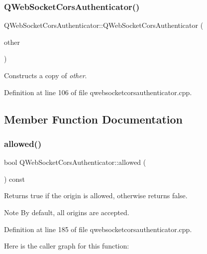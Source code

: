 \subsubsection{\texorpdfstring{Q\+Web\+Socket\+Cors\+Authenticator()}{QWebSocketCorsAuthenticator()}\hspace{0.1cm}{\footnotesize\ttfamily [2/2]}}
{\footnotesize\ttfamily Q\+Web\+Socket\+Cors\+Authenticator\+::\+Q\+Web\+Socket\+Cors\+Authenticator (\begin{DoxyParamCaption}\item[{const \mbox{\hyperlink{class_q_web_socket_cors_authenticator}{Q\+Web\+Socket\+Cors\+Authenticator}} \&}]{other }\end{DoxyParamCaption})\hspace{0.3cm}{\ttfamily [explicit]}}

Constructs a copy of {\itshape other}. 

Definition at line 106 of file qwebsocketcorsauthenticator.\+cpp.



\subsection{Member Function Documentation}
\mbox{\label{class_q_web_socket_cors_authenticator_a2ffc01ec9c913f4d78aa34d44f1c69fb}} 
\subsubsection{\texorpdfstring{allowed()}{allowed()}}
{\footnotesize\ttfamily bool Q\+Web\+Socket\+Cors\+Authenticator\+::allowed (\begin{DoxyParamCaption}{ }\end{DoxyParamCaption}) const}

Returns true if the origin is allowed, otherwise returns false.

\begin{DoxyNote}{Note}
By default, all origins are accepted. 
\end{DoxyNote}


Definition at line 185 of file qwebsocketcorsauthenticator.\+cpp.

Here is the caller graph for this function\+:
\mbox{\label{class_q_web_socket_cors_authenticator_a4e4e60c27f0abd48d6e1662c279c8c80}} 
